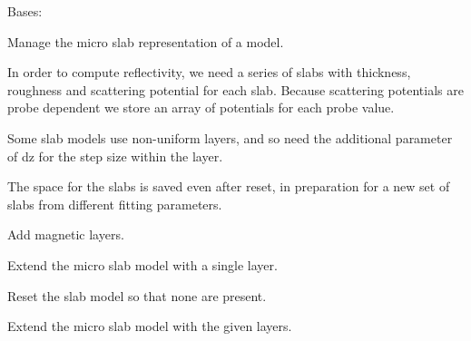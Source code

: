 \documentclass[letterpaper,10pt,english]{sphinxmanual}
\begin{document}
\begin{fulllineitems}
\label{api/profile:refl1d.profile.Microslabs}
Bases: 

Manage the micro slab representation of a model.

In order to compute reflectivity, we need a series of slabs with thickness,
roughness and scattering potential for each slab.  Because scattering
potentials are probe dependent we store an array of potentials for each
probe value.

Some slab models use non-uniform layers, and so need the additional
parameter of dz for the step size within the layer.

The space for the slabs is saved even after reset, in preparation for a
new set of slabs from different fitting parameters.

\begin{fulllineitems}
\label{api/profile:refl1d.profile.Microslabs.add_magnetism}
Add magnetic layers.

\end{fulllineitems}


\begin{fulllineitems}
\label{api/profile:refl1d.profile.Microslabs.append}
Extend the micro slab model with a single layer.

\end{fulllineitems}


\begin{fulllineitems}
\label{api/profile:refl1d.profile.Microslabs.clear}
Reset the slab model so that none are present.

\end{fulllineitems}


\begin{fulllineitems}
\label{api/profile:refl1d.profile.Microslabs.extend}
Extend the micro slab model with the given layers.


\end{fulllineitems}
\end{fulllineitems}
\end{document}
